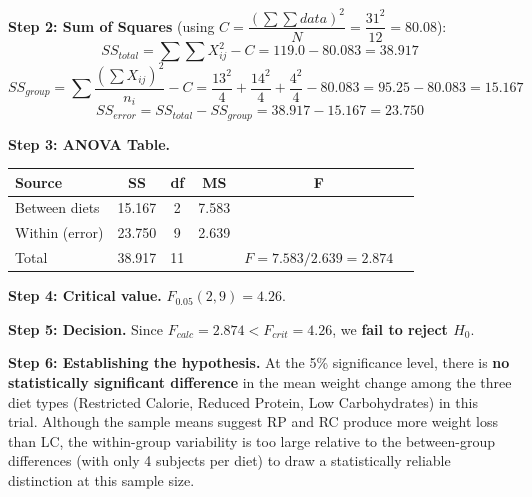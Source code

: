 \documentclass[11pt]{article}
\begin{document}
\textbf{Step 2: Sum of Squares} (using $C=\dfrac{(\sum\sum data)^2}{N}=\dfrac{31^2}{12}=80.08$):
\[
SS_{total} = \sum\sum X_{ij}^2 - C = 119.0 - 80.083 = 38.917
\]
\[
SS_{group} = \sum\frac{(\sum X_{ij})^2}{n_i} - C = \frac{13^2}{4}+\frac{14^2}{4}+\frac{4^2}{4} - 80.083 = 95.25-80.083 = 15.167
\]
\[
SS_{error} = SS_{total}-SS_{group} = 38.917-15.167 = 23.750
\]

\textbf{Step 3: ANOVA Table.}
\begin{center}
\begin{tabular}{lccccc}
\toprule
Source & SS & df & MS & F \\
\midrule
Between diets & 15.167 & 2 & 7.583 & \\
Within (error) & 23.750 & 9 & 2.639 & \\
\midrule
Total & 38.917 & 11 & & $F = 7.583/2.639 = 2.874$ \\
\bottomrule
\end{tabular}
\end{center}

\textbf{Step 4: Critical value.} $F_{0.05}(2,9) = 4.26$.

\textbf{Step 5: Decision.} Since $F_{calc} = 2.874 < F_{crit} = 4.26$, we \textbf{fail to reject $H_0$}.

\textbf{Step 6: Establishing the hypothesis.} At the 5\% significance level, there is \textbf{no statistically significant difference} in the mean weight change among the three diet types (Restricted Calorie, Reduced Protein, Low Carbohydrates) in this trial. Although the sample means suggest RP and RC produce more weight loss than LC, the within-group variability is too large relative to the between-group differences (with only 4 subjects per diet) to draw a statistically reliable distinction at this sample size.
\end{document}
